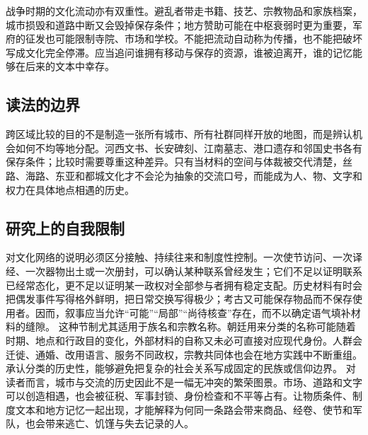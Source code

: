 战争时期的文化流动亦有双重性。避乱者带走书籍、技艺、宗教物品和家族档案，城市损毁和道路中断又会毁掉保存条件；地方赞助可能在中枢衰弱时更为重要，军府的征发也可能限制寺院、市场和学校。不能把流动自动称为传播，也不能把破坏写成文化完全停滞。应当追问谁拥有移动与保存的资源，谁被迫离开，谁的记忆能够在后来的文本中幸存。  \subsection{读法的边界} 跨区域比较的目的不是制造一张所有城市、所有社群同样开放的地图，而是辨认机会如何不均等地分配。河西文书、长安碑刻、江南墓志、港口遗存和邻国史书各有保存条件；比较时需要尊重这种差异。只有当材料的空间与体裁被交代清楚，丝路、海路、东亚和都城文化才不会沦为抽象的交流口号，而能成为人、物、文字和权力在具体地点相遇的历史。  \subsection{研究上的自我限制} 对文化网络的说明必须区分接触、持续往来和制度性控制。一次使节访问、一次译经、一次器物出土或一次册封，可以确认某种联系曾经发生；它们不足以证明联系已经常态化，更不足以证明某一政权对全部参与者拥有稳定支配。历史材料有时会把偶发事件写得格外鲜明，把日常交换写得极少；考古又可能保存物品而不保存使用者。因而，叙事应当允许“可能”“局部”“尚待核查”存在，而不以确定语气填补材料的缝隙。  这种节制尤其适用于族名和宗教名称。朝廷用来分类的名称可能随着时期、地点和行政目的变化，外部材料的自称又未必可直接对应现代身份。人群会迁徙、通婚、改用语言、服务不同政权，宗教共同体也会在地方实践中不断重组。承认分类的历史性，能够避免把复杂的社会关系写成固定的民族或信仰边界。  对读者而言，城市与交流的历史因此不是一幅无冲突的繁荣图景。市场、道路和文字可以创造相遇，也会被征税、军事封锁、身份检查和不平等占有。让物质条件、制度文本和地方记忆一起出现，才能解释为何同一条路会带来商品、经卷、使节和军队，也会带来逃亡、饥馑与失去记录的人。